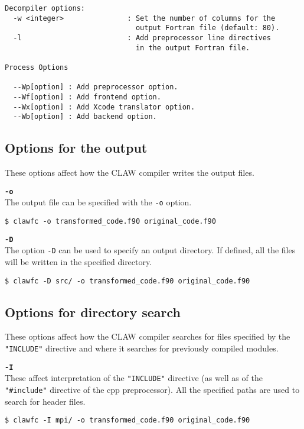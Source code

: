 \documentclass{article}
\begin{document}
\begin{lstlisting}
Decompiler options:
  -w <integer>               : Set the number of columns for the
                               output Fortran file (default: 80).
  -l                         : Add preprocessor line directives
                               in the output Fortran file.

Process Options

  --Wp[option] : Add preprocessor option.
  --Wf[option] : Add frontend option.
  --Wx[option] : Add Xcode translator option.
  --Wb[option] : Add backend option.
\end{lstlisting}

\subsection{Options for the output}
These options affect how the CLAW compiler writes the output files.

\textbf{\texttt{-o}}\\
The output file can be specified with the \texttt{-o} option.
\begin{lstlisting}
$ clawfc -o transformed_code.f90 original_code.f90
\end{lstlisting}

\textbf{\texttt{-D}}\\
The option \texttt{-D} can be used to specify an output directory. If defined, all the files
will be written in the specified directory.

\begin{lstlisting}
$ clawfc -D src/ -o transformed_code.f90 original_code.f90
\end{lstlisting}

\subsection{Options for directory search}
These options affect how the CLAW compiler searches for files specified by the
\texttt{"INCLUDE"} directive and where it searches for previously compiled modules.

\textbf{\texttt{-I}}\\
These affect interpretation of the \texttt{"INCLUDE"} directive (as well as of the \texttt{"\#include"} directive of the cpp preprocessor).
All the specified paths are used to search for header files.
\begin{lstlisting}
$ clawfc -I mpi/ -o transformed_code.f90 original_code.f90
\end{lstlisting}
\end{document}
